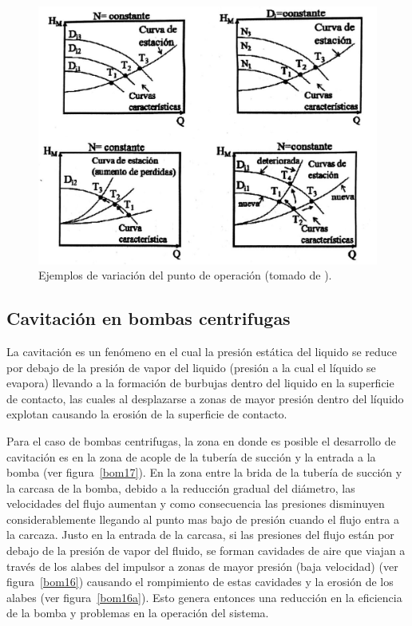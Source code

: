 \documentclass[11pt, oneside]{article}
\begin{document}
\begin{figure}[h]
\centering
\includegraphics[width=12cm]{./figs/bom15.jpeg}
\caption{Ejemplos de variaci\'on del punto de operaci\'on (tomado de \cite{agudelo2011mecanica}).} 
\label{bom15}
\end{figure}

\subsection{Cavitaci\'on en bombas centrifugas}
La cavitaci\'on es un fen\'omeno en el cual la presi\'on est\'atica del liquido se reduce por debajo de la presi\'on de vapor del liquido (presi\'on a la cual el l\'iquido se evapora) llevando a la formaci\'on de burbujas dentro del liquido en la superficie de contacto, las cuales al desplazarse a zonas de mayor presi\'on dentro del l\'iquido explotan causando la erosi\'on de la superficie de contacto.

Para el caso de bombas centrifugas, la zona en donde es posible el desarrollo de cavitaci\'on es en la zona de acople de la tuber\'ia de succi\'on y la entrada a la bomba (ver figura~\ref{bom17}). En la zona entre la brida de la tuber\'ia de succi\'on y la carcasa de la bomba, debido a la reducci\'on gradual del di\'ametro, las velocidades del flujo aumentan y como consecuencia las presiones disminuyen considerablemente llegando al punto mas bajo de presi\'on cuando el flujo entra a la carcaza. Justo en la entrada de la carcasa, si las presiones del flujo est\'an por debajo de la presi\'on de vapor del fluido, se forman cavidades de aire que viajan a trav\'es de los alabes del impulsor a zonas de mayor presi\'on (baja velocidad) (ver figura~\ref{bom16})  causando el rompimiento de estas cavidades y la erosi\'on de los alabes (ver figura~\ref{bom16a}). Esto genera entonces una reducci\'on en la eficiencia de la bomba y problemas en la operaci\'on del sistema.
\end{document}
